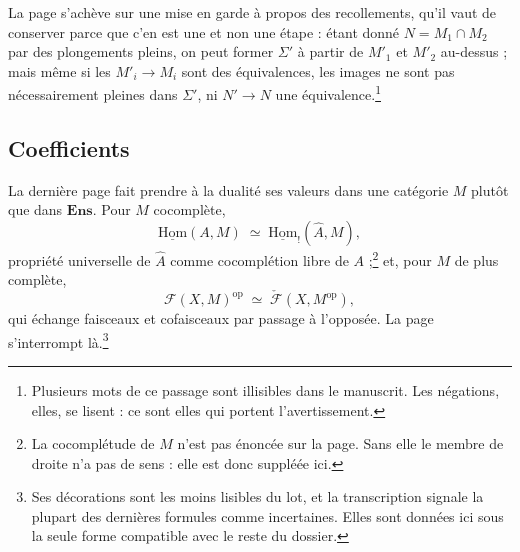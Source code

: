 \documentclass[11pt,a4paper]{article}
\begin{document}
La page s'achève sur une mise en garde à propos des recollements, qu'il
vaut de conserver parce que c'en est une et non une étape : étant donné
$N = M_{1} \cap M_{2}$ par des plongements pleins, on peut former $\Sigma'$ à
partir de $M'_{1}$ et $M'_{2}$ au-dessus ; mais même si les $M'_{i} \to M_{i}$
sont des équivalences, les images ne sont pas nécessairement pleines dans
$\Sigma'$, ni $N' \to N$ une équivalence.\footnote{Plusieurs mots de ce
passage sont illisibles dans le manuscrit. Les négations, elles, se lisent :
ce sont elles qui portent l'avertissement.}

\subsection*{Coefficients}

La dernière page fait prendre à la dualité ses valeurs dans une catégorie
$M$ plutôt que dans $\mathbf{Ens}$. Pour $M$ cocomplète,
\[
\underline{\mathrm{Hom}}(A, M) \;\simeq\; \underline{\mathrm{Hom}}_{!}(\widehat{A}, M),
\]
propriété universelle de $\widehat{A}$ comme cocomplétion libre de
$A$ ;\footnote{La cocomplétude de $M$ n'est pas énoncée sur la page. Sans
elle le membre de droite n'a pas de sens : elle est donc suppléée ici.} et,
pour $M$ de plus complète,
\[
\mathcal{F}(X, M)^{\mathrm{op}} \;\simeq\; \check{\mathcal{F}}(X, M^{\mathrm{op}}),
\]
qui échange faisceaux et cofaisceaux par passage à l'opposée. La page
s'interrompt là.\footnote{Ses décorations sont les moins lisibles du lot, et
la transcription signale la plupart des dernières formules comme incertaines.
Elles sont données ici sous la seule forme compatible avec le reste du
dossier.}
\end{document}

